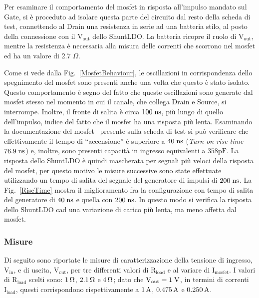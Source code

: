 Per esaminare il comportamento del mosfet in risposta all'impulso mandato sul Gate, si è proceduto ad isolare questa parte del circuito dal resto della scheda di test, connettendo al Drain una resistenza in serie ad una batteria stilo, al posto della connessione con il $\mathrm{V_{out}}$ dello ShuntLDO.
La batteria ricopre il ruolo di $\mathrm{V_{out}}$, mentre la resistenza è necessaria alla misura delle correnti che scorrono nel mosfet ed ha un valore di 2.7 $\Omega$. 


Come si vede dalla Fig.~\ref{MosfetBehaviour}, le oscillazioni in corrispondenza dello spegnimento del mosfet sono presenti anche una volta che questo è stato isolato.
Questo comportamento è segno del fatto che queste oscillazioni sono generate dal mosfet stesso nel momento in cui il canale, che collega Drain e Source, si interrompe.
Inoltre, il fronte di salita è circa $100 \rm \; ns$, più lungo di quello dell'impulso, indice del fatto che il mosfet ha una risposta più lenta. %
Esaminando la documentazione del mosfet~\cite{MOSFET} presente sulla scheda di test 
si può verificare che effettivamente il tempo di ``accensione'' è superiore a $40 \rm \; ns$ (\textit{Turn-on rise time} $76.9 \rm \; ns$) e, inoltre, sono presenti capacità in ingresso equivalenti a $\mathrm{358 pF}$.
La risposta dello ShuntLDO è quindi mascherata per segnali più veloci della risposta del mosfet, per questo motivo le misure successive sono state effettuate utilizzando un tempo di salita del segnale del generatore di impulsi di $200 \rm \; ns$.
La Fig.~\ref{RiseTime} mostra il miglioramento fra la configurazione con tempo di salita del generatore di $40 \rm \; ns$ e quella con $200 \rm \; ns$.
In questo modo si verifica la risposta dello ShuntLDO cad una variazione di carico più lenta, ma meno affetta dal mosfet.

\subsubsection{Misure}

Di seguito sono riportate le misure di caratterizzazione della tensione di ingresso, $\mathrm{V_{in}}$, e di uscita, $\mathrm{V_{out}}$, per tre differenti valori di $\mathrm{R_{load}}$ e al variare di $\mathrm{I_{mosfet}}$.
I valori di $\mathrm{R_{load}}$ scelti sono: $1 {\rm \, \Omega}$, $2.1 {\rm \, \Omega}$ e $4 {\rm \, \Omega}$; dato che $\mathrm{V_{out}=1 \rm \; V}$, in termini di correnti  $\mathrm{I_{load}}$, questi corrispondono rispettivamente a $1 \rm \, A$, $0.475 \rm \, A$ e $0.250 \rm \, A$.

